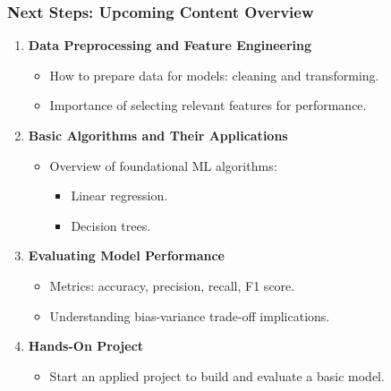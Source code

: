 \documentclass[aspectratio=169]{beamer}
\begin{document}
\begin{frame}[fragile]
    \frametitle{Next Steps: Upcoming Content Overview}
    \begin{enumerate}
        \item \textbf{Data Preprocessing and Feature Engineering}
        \begin{itemize}
            \item How to prepare data for models: cleaning and transforming.
            \item Importance of selecting relevant features for performance.
        \end{itemize}

        \item \textbf{Basic Algorithms and Their Applications}
        \begin{itemize}
            \item Overview of foundational ML algorithms:
            \begin{itemize}
                \item Linear regression.
                \item Decision trees.
            \end{itemize}
        \end{itemize}

        \item \textbf{Evaluating Model Performance}
        \begin{itemize}
            \item Metrics: accuracy, precision, recall, F1 score.
            \item Understanding bias-variance trade-off implications.
        \end{itemize}

        \item \textbf{Hands-On Project}
        \begin{itemize}
            \item Start an applied project to build and evaluate a basic model.
        \end{itemize}
    \end{enumerate}
\end{frame}
\end{document}
